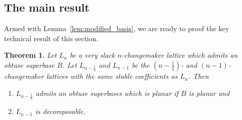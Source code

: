 \documentclass{amsart} %
\theoremstyle{thm}
\newtheorem{thm}[Theorem]{Theorem}
\theoremstyle{definition}
\numberwithin{equation}{section}
\begin{document}
\subsection{The main result}
Armed with Lemma~\ref{lem:modified_basis}, we are ready to proof the key technical result of this section. 
\begin{thm}\label{thm:very_slack_technical}
Let $L_n$ be a very slack $n$-changemaker lattice which admits an obtuse superbase $B$. Let $L_{n-\frac12}$ and $L_{n-1}$ be the $(n-\frac12)$- and $(n-1)$-changemaker lattices with the same stable coefficients as $L_n$. Then
\begin{enumerate}
    \item $L_{n-\frac12}$ admits an obtuse superbases which is planar if $B$ is planar and
    \item $L_{n-1}$ is decomposable.
\end{enumerate}
\end{thm}
\end{document}
